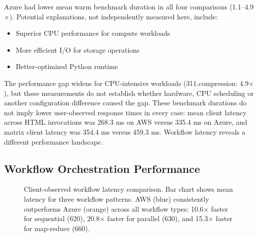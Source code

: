 \documentclass[sigconf,nonacm]{acmart}
\begin{document}
Azure had lower mean warm benchmark duration in all four comparisons (1.1--4.9$\times$). Potential explanations, not independently measured here, include:
\begin{itemize}
    \item Superior CPU performance for compute workloads
    \item More efficient I/O for storage operations
    \item Better-optimized Python runtime
\end{itemize}

The performance gap widens for CPU-intensive workloads (311.compression: 4.9$\times$), but these measurements do not establish whether hardware, CPU scheduling or another configuration difference caused the gap. These benchmark durations do not imply lower user-observed response times in every case: mean client latency across HTML invocations was 268.3 ms on AWS versus 335.4 ms on Azure, and matrix client latency was 354.4 ms versus 459.3 ms. Workflow latency reveals a different performance landscape.

\subsection{Workflow Orchestration Performance}

\begin{figure}[t]
\centering
\caption{Client-observed workflow latency comparison. Bar chart shows mean latency for three workflow patterns. AWS (blue) consistently outperforms Azure (orange) across all workflow types: 10.6$\times$ faster for sequential (620), 20.8$\times$ faster for parallel (630), and 15.3$\times$ faster for map-reduce (660).}
\label{fig:workflow_performance}
\end{figure}
\end{document}
